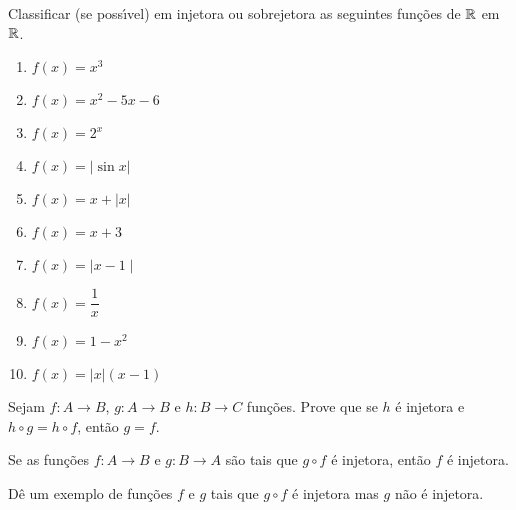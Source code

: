 \documentclass[12pt]{exam}
\begin{document}
    \vspace{.3cm}

    \questao{} Classificar (se poss{\'\i}vel) em injetora ou sobrejetora as seguintes fun{\c c}{\~o}es de $\mathbb{R}$ em $\mathbb{R}$.

    \begin{multicols}{2}
        \begin{enumerate}[label={\alph*})]
            \item $f(x) = x^3$

            \item $f(x) = x^2 - 5x - 6$

            \item $f(x) = 2^x$

            \item $f(x) = | \sin x |$

            \item $f(x) = x + | x |$

            \item $f(x) = x + 3$

            \item $f(x) = \mid x - 1\mid$

            \item $f(x) = \dfrac{1}{x}$

            \item $f(x) = 1 - x^2$

            \item $f(x) = |x|(x - 1)$
        \end{enumerate}
    \end{multicols}

    \vspace{.3cm}

    \questao{} Sejam $f : A \to B$, $g : A \to B$ e $h : B \to C$ fun\c{c}\~oes. Prove que se $h$ \'e injetora e $h \circ g = h \circ f$, ent\~ao $g = f$.

    \vspace{.3cm}

    \questao{} Se as fun{\c c}{\~o}es $f : A \to B$ e $g : B\to A$ s{\~a}o
    tais que $g\circ f$ {\'e} injetora, ent{\~a}o $f$ {\'e} injetora.

    \vspace{.3cm}

    \questao{} Dê um exemplo de funções $f$ e $g$ tais que $g \circ f$ é injetora mas $g$ não é injetora.

    \vspace{.3cm}
\end{document}
